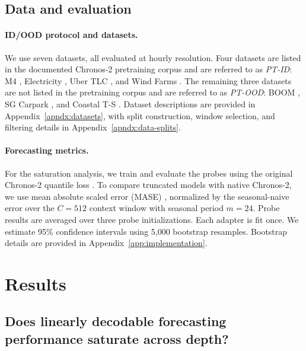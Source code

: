 \documentclass{article}
\begin{document}
\subsection{Data and evaluation} \label{sec:data-eval}

\paragraph{ID/OOD protocol and datasets.}
We use seven datasets, all evaluated at hourly resolution. Four datasets are listed in the documented Chronos-2 pretraining corpus \citep{ansari2025chronos2univariateuniversalforecasting} and are referred to as \textit{PT-ID}: M4 \citep{MAKRIDAKIS202054}, Electricity \citep{godahewa2021monashtimeseriesforecasting}, Uber TLC \citep{fivethirtyeight_uber_tlc}, and Wind Farms \citep{godahewa2021monashtimeseriesforecasting}. The remaining three datasets are not listed in the pretraining corpus and are referred to as \textit{PT-OOD}: BOOM \citep{cohen2025timedifferentobservabilityperspective}, SG Carpark \citep{qiao2026itstimegenerationtime}, and Coastal T-S \citep{qiao2026itstimegenerationtime}. Dataset descriptions are provided in Appendix~\ref{apndx:datasets}, with split construction, window selection, and filtering details in Appendix~\ref{apndx:data-splits}.

\paragraph{Forecasting metrics.}
For the saturation analysis, we train and evaluate the probes using the original Chronos-2 quantile loss \citep{ansari2025chronos2univariateuniversalforecasting}. To compare truncated models with native Chronos-2, we use mean absolute scaled error (MASE) \citep{HYNDMAN2006679}, normalized by the seasonal-naive error over the \(C=512\) context window with seasonal period \(m=24\). Probe results are averaged over three probe initializations. Each adapter is fit once. We estimate 95\% confidence intervals using 5,000 bootstrap resamples. Bootstrap details are provided in Appendix~\ref{app:implementation}.


\section{Results}

\subsection{Does linearly decodable forecasting performance saturate across depth?}
\label{sec:tunnel}
\end{document}
